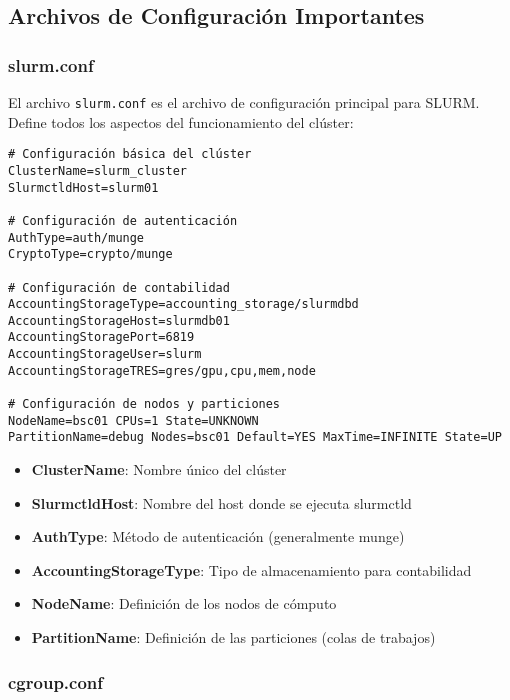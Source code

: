\documentclass[12pt,a4paper]{article}
\begin{document}
\subsection{Archivos de Configuración Importantes}

\subsubsection{slurm.conf}

El archivo \texttt{slurm.conf} es el archivo de configuración principal para SLURM. Define todos los aspectos del funcionamiento del clúster:

\begin{lstlisting}[language=slurm, caption=Extracto de slurm.conf]
# Configuración básica del clúster
ClusterName=slurm_cluster
SlurmctldHost=slurm01

# Configuración de autenticación
AuthType=auth/munge
CryptoType=crypto/munge

# Configuración de contabilidad
AccountingStorageType=accounting_storage/slurmdbd
AccountingStorageHost=slurmdb01
AccountingStoragePort=6819
AccountingStorageUser=slurm
AccountingStorageTRES=gres/gpu,cpu,mem,node

# Configuración de nodos y particiones
NodeName=bsc01 CPUs=1 State=UNKNOWN
PartitionName=debug Nodes=bsc01 Default=YES MaxTime=INFINITE State=UP
\end{lstlisting}

\begin{infobox}
\begin{itemize}
    \item \textbf{ClusterName}: Nombre único del clúster
    \item \textbf{SlurmctldHost}: Nombre del host donde se ejecuta slurmctld
    \item \textbf{AuthType}: Método de autenticación (generalmente munge)
    \item \textbf{AccountingStorageType}: Tipo de almacenamiento para contabilidad
    \item \textbf{NodeName}: Definición de los nodos de cómputo
    \item \textbf{PartitionName}: Definición de las particiones (colas de trabajos)
\end{itemize}
\end{infobox}

\subsubsection{cgroup.conf}
\end{document}
